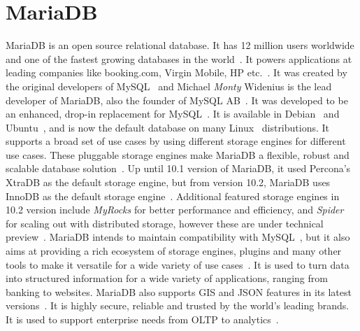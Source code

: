 \section{MariaDB}


MariaDB is an open source relational database. It has 12 million users worldwide 
and one of the fastest growing databases in the 
world~\cite{hid-sp18-516-www-mariadb}. It powers applications at leading 
companies like booking.com, Virgin Mobile, HP 
etc.~\cite{hid-sp18-516-www-mariadb}. It was created by the original developers
of MySQL~\cite{hid-sp18-516-www-wiki-mysql} and Michael \textit{Monty} Widenius 
is the lead developer of MariaDB, also the founder of MySQL 
AB~\cite{hid-sp18-516-www-wiki-mariadb}. It was developed to be an enhanced, 
drop-in replacement for MySQL~\cite{hid-sp18-516-www-mariadb-foundation}. It is 
available in Debian~\cite{hid-sp18-516-www-debian-org} and 
Ubuntu~\cite{hid-sp18-516-www-wiki-ubuntu}, and is now the default database on 
many Linux~\cite{hid-sp18-516-www-wiki-linux} distributions. It supports a broad 
set of use cases by using different storage engines for different use cases. These 
pluggable storage engines make MariaDB a flexible, robust and scalable database 
solution~\cite{hid-sp18-516-www-mariadb-server}. Up until 10.1 version of MariaDB, 
it used Percona's XtraDB as the default storage engine, but from version 10.2, 
MariaDB uses InnoDB as the default storage 
engine~\cite{hid-sp18-516-www-wiki-xtradb}. Additional featured storage engines
in 10.2 version include \textit{MyRocks} for better performance and efficiency,
and \textit{Spider} for scaling out with distributed storage, however these are
under technical preview~\cite{hid-sp18-516-www-mariadb-server}. MariaDB intends
to maintain compatibility with MySQL~\cite{hid-sp18-516-www-wiki-mariadb}, but
it also aims at providing a rich ecosystem of storage engines, plugins and many
other tools to make it versatile for a wide variety of use
cases~\cite{hid-sp18-516-www-mariadb-foundation}. It is used to turn data into
structured information for a wide variety of applications, ranging from banking
to websites. MariaDB also supports GIS and JSON features in its latest
versions~\cite{hid-sp18-516-www-mariadb-foundation}. It is highly secure,
reliable and trusted by the world's leading brands. It is used to support
enterprise needs from OLTP to analytics~\cite{hid-sp18-516-www-mariadb}.
